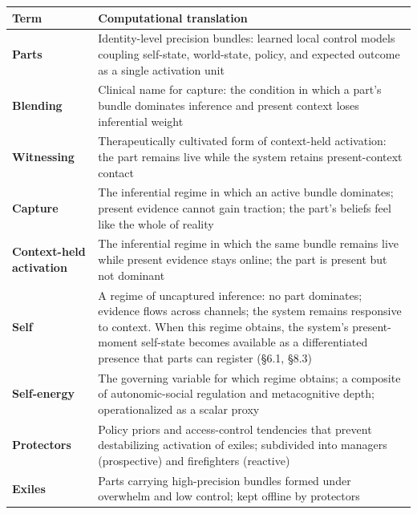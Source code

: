 \documentclass[12pt,a4paper]{article}
\newcounter{none}
\begin{document}
{\def\LTcaptype{none} %
\begin{longtable}[]{@{}
  >{\raggedright\arraybackslash}p{}
  >{\raggedright\arraybackslash}p{}@{}}
\toprule\noalign{}
\begin{minipage}[b]{\linewidth}\raggedright
Term
\end{minipage} & \begin{minipage}[b]{\linewidth}\raggedright
Computational translation
\end{minipage} \\
\midrule\noalign{}
\endhead
\bottomrule\noalign{}
\endlastfoot
\textbf{Parts} & Identity-level precision bundles: learned local control
models coupling self-state, world-state, policy, and expected outcome as
a single activation unit \\
\textbf{Blending} & Clinical name for capture: the condition in which a
part's bundle dominates inference and present context loses inferential
weight \\
\textbf{Witnessing} & Therapeutically cultivated form of context-held
activation: the part remains live while the system retains
present-context contact \\
\textbf{Capture} & The inferential regime in which an active bundle
dominates; present evidence cannot gain traction; the part's beliefs
feel like the whole of reality \\
\textbf{Context-held activation} & The inferential regime in which the
same bundle remains live while present evidence stays online; the part
is present but not dominant \\
\textbf{Self} & A regime of uncaptured inference: no part dominates;
evidence flows across channels; the system remains responsive to
context. When this regime obtains, the system's present-moment
self-state becomes available as a differentiated presence that parts can
register (§6.1, §8.3) \\
\textbf{Self-energy} & The governing variable for which regime obtains;
a composite of autonomic-social regulation and metacognitive depth;
operationalized as a scalar proxy \\
\textbf{Protectors} & Policy priors and access-control tendencies that
prevent destabilizing activation of exiles; subdivided into managers
(prospective) and firefighters (reactive) \\
\textbf{Exiles} & Parts carrying high-precision bundles formed under
overwhelm and low control; kept offline by protectors \\

\end{longtable}}
\end{document}

